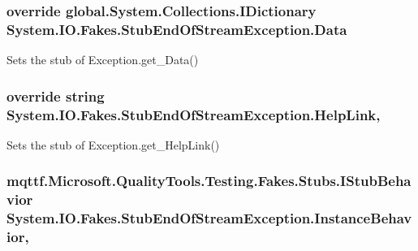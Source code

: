 \hypertarget{class_system_1_1_i_o_1_1_fakes_1_1_stub_end_of_stream_exception_af844a10c3caf1e528b0df608b6d48cfd}{
\subsubsection[{Data}]{\setlength{\rightskip}{0pt plus 5cm}override global.\-System.\-Collections.\-I\-Dictionary System.\-I\-O.\-Fakes.\-Stub\-End\-Of\-Stream\-Exception.\-Data\hspace{0.3cm}{\ttfamily [get]}}}\label{class_system_1_1_i_o_1_1_fakes_1_1_stub_end_of_stream_exception_af844a10c3caf1e528b0df608b6d48cfd}


Sets the stub of Exception.\-get\-\_\-\-Data()

\hypertarget{class_system_1_1_i_o_1_1_fakes_1_1_stub_end_of_stream_exception_ad3cffd314e73a07fcc954a563ce59bf4}{
\subsubsection[{Help\-Link}]{\setlength{\rightskip}{0pt plus 5cm}override string System.\-I\-O.\-Fakes.\-Stub\-End\-Of\-Stream\-Exception.\-Help\-Link\hspace{0.3cm}{\ttfamily [get]}, {\ttfamily [set]}}}\label{class_system_1_1_i_o_1_1_fakes_1_1_stub_end_of_stream_exception_ad3cffd314e73a07fcc954a563ce59bf4}


Sets the stub of Exception.\-get\-\_\-\-Help\-Link()

\hypertarget{class_system_1_1_i_o_1_1_fakes_1_1_stub_end_of_stream_exception_acba8fc0043d32e86e755842220042dbf}{
\subsubsection[{Instance\-Behavior}]{\setlength{\rightskip}{0pt plus 5cm}mqttf.\-Microsoft.\-Quality\-Tools.\-Testing.\-Fakes.\-Stubs.\-I\-Stub\-Behavior System.\-I\-O.\-Fakes.\-Stub\-End\-Of\-Stream\-Exception.\-Instance\-Behavior\hspace{0.3cm}{\ttfamily [get]}, {\ttfamily [set]}}}\label{class_system_1_1_i_o_1_1_fakes_1_1_stub_end_of_stream_exception_acba8fc0043d32e86e755842220042dbf}


